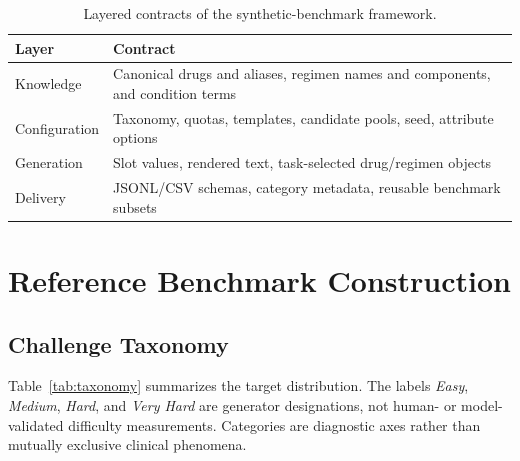 \documentclass[conference]{IEEEtran}
\begin{document}
\begin{table}[t]
\caption{Layered contracts of the synthetic-benchmark framework.}
\label{tab:contracts}
\centering
\footnotesize
\begin{tabularx}{\columnwidth}{@{}l Y@{}}
\toprule
\textbf{Layer} & \textbf{Contract} \\
\midrule
Knowledge & Canonical drugs and aliases, regimen names and components, and condition terms \\
Configuration & Taxonomy, quotas, templates, candidate pools, seed, attribute options \\
Generation & Slot values, rendered text, task-selected drug/regimen objects \\
Delivery & JSONL/CSV schemas, category metadata, reusable benchmark subsets \\
\bottomrule
\end{tabularx}
\end{table}

\section{Reference Benchmark Construction}
\label{sec:design}

\subsection{Challenge Taxonomy}

Table~\ref{tab:taxonomy} summarizes the target distribution. The labels
\emph{Easy}, \emph{Medium}, \emph{Hard}, and \emph{Very Hard} are generator
designations, not human- or model-validated difficulty measurements. Categories
are diagnostic axes rather than mutually exclusive clinical phenomena.
\end{document}
